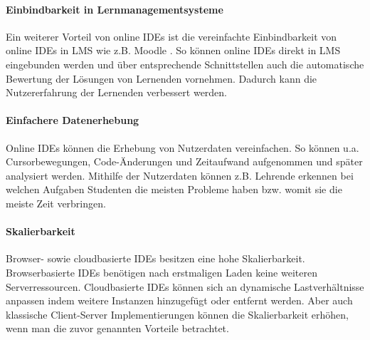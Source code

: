 \paragraph{Einbindbarkeit in Lernmanagementsysteme}
Ein weiterer Vorteil von online IDEs ist die vereinfachte Einbindbarkeit von online IDEs in \ac{LMS} wie z.B. Moodle \cite{noauthor_moodle_nodate}. So können online IDEs direkt in LMS eingebunden werden und über entsprechende Schnittstellen auch die automatische Bewertung der Lösungen von Lernenden vornehmen. Dadurch kann die Nutzererfahrung der Lernenden verbessert werden.

\paragraph{Einfachere Datenerhebung}
Online IDEs können die Erhebung von Nutzerdaten vereinfachen. So können u.a. Cursorbewegungen, Code-Änderungen und Zeitaufwand aufgenommen und später analysiert werden. Mithilfe der Nutzerdaten können z.B. Lehrende erkennen bei welchen Aufgaben Studenten die meisten Probleme haben bzw. womit sie die meiste Zeit verbringen.

\paragraph{Skalierbarkeit}
Browser- sowie cloudbasierte IDEs besitzen eine hohe Skalierbarkeit. Browserbasierte IDEs benötigen nach erstmaligen Laden keine weiteren Serverressourcen. Cloudbasierte IDEs können sich an dynamische Lastverhältnisse anpassen indem weitere Instanzen hinzugefügt oder entfernt werden. Aber auch klassische Client-Server Implementierungen können die Skalierbarkeit erhöhen, wenn man die zuvor genannten Vorteile betrachtet.